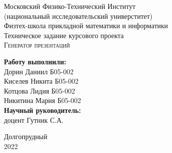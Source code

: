 



  \begin{titlepage}	%

    \thispagestyle{empty}
    \begin{center}		%

      \large Московский Физико-Технический Институт \\
          \large (национальный исследовательский универститет) \\
      \large Физтех-школа прикладной математики и информатики \\[6cm]

      \large Техническое задание курсового проекта \\
      \huge \textsc{Генератор презентаций} \\[5cm] %

    \end{center}


    \begin{flushright} %
      \begin{minipage}{0.45\textwidth} %
        \begin{flushleft} %

          \large\textbf{Работу выполнили:}\\
          \large Дорин Даниил Б05-002 \\
                  \large Киселев Никита Б05-002 \\
                  \large Котцова Лидия Б05-002 \\
                  \large Никитина Мария Б05-002 \\

          \large \textbf{Научный руководитель:}\\
          \large доцент Гутник С.А.

        \end{flushleft}
      \end{minipage}
    \end{flushright}

    \vfill %

    \begin{center}
      \large Долгопрудный \\
      \large 2022 %
    \end{center} %

    \pagebreak

  \end{titlepage} %
  \newpage


